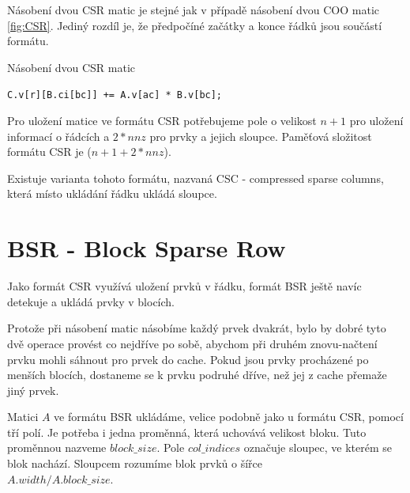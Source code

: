 Násobení dvou CSR matic je stejné jak v případě násobení dvou COO matic \ref{fig:CSR}. Jediný rozdíl je, že předpočíné začátky a konce řádků jsou součástí formátu.

\label{alg:csr-mmm}
\begin{algorithm}[htb]
	\caption{Násobení dvou CSR matic}\label{csr-mmm}
	\begin{algorithmic}[1]
					\State \texttt{C.v[r][B.ci[bc]] += A.v[ac] * B.v[bc];}
				\EndFor
			\EndFor
		\EndFor
		\EndProcedure
	\end{algorithmic}
\end{algorithm}

Pro uložení matice ve formátu CSR potřebujeme pole o velikost $n + 1$ pro uložení informací o řádcích a $2 * nnz$ pro prvky a jejich sloupce. Paměťová složitost formátu CSR je \bigO($ n+1 + 2*nnz $). 

Existuje varianta tohoto formátu, nazvaná CSC - compressed sparse columns, která místo ukládání řádku ukládá sloupce.

\section{BSR - Block Sparse Row}

Jako formát CSR využívá uložení prvků v řádku, formát BSR\cite{bsrscipy}\cite{bsrintel} ještě navíc detekuje a ukládá prvky v blocích.

Protože při násobení matic násobíme každý prvek dvakrát, bylo by dobré tyto dvě operace provést co nejdříve po sobě, abychom při druhém znovu-načtení prvku mohli sáhnout pro prvek do cache. Pokud jsou prvky procházené po menších blocích, dostaneme se k prvku podruhé dříve, než jej z cache přemaže jiný prvek.

Matici $A$ ve formátu BSR ukládáme, velice podobně jako u formátu CSR, pomocí tří polí. Je potřeba i jedna proměnná, která uchovává velikost bloku. Tuto proměnnou nazveme $block\_size$. Pole $col\_indices$ označuje sloupec, ve kterém se blok nachází. Sloupcem rozumíme blok prvků o šířce \\ $A.width / A.block\_size$.

